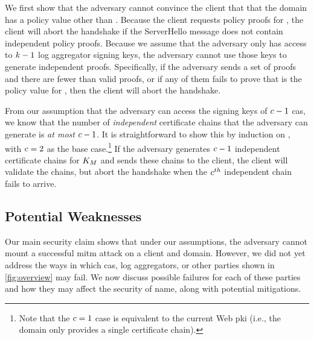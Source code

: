 We first show that the adversary cannot convince the client that that the domain
has a policy value other than \policy. Because the client requests \numlas
policy proofs for \domain, the client will abort the handshake if the 
ServerHello message does not contain \numlas independent policy
proofs. Because we assume that the adversary only has access to $k - 1$
log aggregator signing keys, the adversary cannot use those keys to
generate \numlas independent proofs. Specifically, if the adversary sends a set
of proofs and there are fewer than \numlas valid proofs, or if any of them fails
to prove that \policy is the policy value for \domain, then the client will
abort the handshake.


From our assumption that the adversary can access the signing keys
of $c - 1$ \acp{ca},
we know that the number of \emph{independent} certificate chains that the adversary can generate
is \emph{at most} $c - 1$. It is straightforward to show this by induction
on \policy, with $c = 2$ as the base case.\footnote{Note that the $c
= 1$ case is equivalent to the current Web \ac{pki} (i.e., the domain only
provides a single certificate chain).} If the adversary generates $c - 1$
independent certificate chains for $K_M$ and sends these chains to
the client, the client will validate the chains, but abort the handshake when
the $c^{th}$ independent chain fails to arrive. 

\subsection{Potential Weaknesses}
\label{sec:analysis:weaknesses}

Our main security claim shows that under our assumptions, the adversary cannot
mount a successful \ac{mitm} attack on a client and domain. However, we did not
yet address the ways in which \acp{ca}, log aggregators, or other parties shown
in \autoref{fig:overview} may fail. We now discuss possible failures for each
of these parties and how they may affect the security of \ac{name}, along with
potential mitigations.


